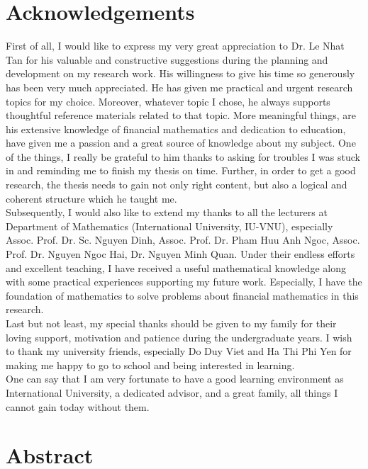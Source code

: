 \documentclass[12pt,a4paper,left=2cm,right=2cm,oneside,titlepage]{report}
\numberwithin{equation}{section}
\begin{document}
\chapter*{Acknowledgements}

\fontsize{11pt}{20pt}\selectfont  First of all, I would like to express my very great appreciation to Dr. Le Nhat Tan for his valuable and constructive suggestions during the planning and development on my research work. His willingness to give his time so generously has been very much appreciated. He has given me practical and urgent research topics for my choice. Moreover, whatever topic I chose, he always supports thoughtful reference materials related to that topic. More meaningful things, are his extensive knowledge of financial mathematics and dedication to education, have given me a passion and a great source of knowledge about my subject. One of the things,  I really be grateful to him thanks to asking for troubles I was stuck in and reminding me to finish my thesis on time. Further, in order to get a good research, the thesis needs to gain not only right content, but also a logical and coherent structure which he taught me. \\[0.5cm]
Subsequently, I would also like to extend my thanks to all the lecturers at Department of Mathematics
(International University, IU-VNU), especially Assoc. Prof. Dr. Sc. Nguyen
Dinh, Assoc. Prof. Dr. Pham Huu Anh Ngoc, Assoc. Prof. Dr. Nguyen Ngoc Hai, Dr. Nguyen Minh Quan. Under their endless efforts and excellent teaching, I have received a useful mathematical knowledge along with some practical experiences supporting my future work. Especially, I have the foundation of mathematics to solve problems about financial mathematics in this research. \\[0.5cm]
Last but not least, my special thanks should be given to my family for their loving
support, motivation and patience during the undergraduate years. I wish to thank my university friends, especially Do Duy Viet and Ha Thi Phi Yen for making me happy to go to school and being interested in learning.\\[0.5cm] 
 One can say that I am very fortunate to have a good learning environment as International University, a dedicated advisor, and a great family, all things I cannot gain today without them.

 
  \chapter*{Abstract}
  
\end{document}
